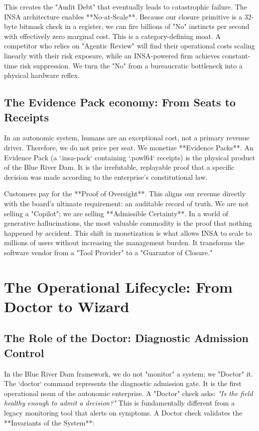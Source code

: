 \documentclass[12pt,a4paper,oneside]{book}
\begin{document}
This creates the "Audit Debt" that eventually leads to catastrophic failure. The INSA architecture enables **No-at-Scale**. Because our closure primitive is a 32-byte bitmask check in a register, we can fire billions of "No" instincts per second with effectively zero marginal cost. This is a category-defining moat. A competitor who relies on "Agentic Review" will find their operational costs scaling linearly with their risk exposure, while an INSA-powered firm achieves constant-time risk suppression. We turn the "No" from a bureaucratic bottleneck into a physical hardware reflex.

\section{The Evidence Pack economy: From Seats to Receipts}
In an autonomic system, humans are an exceptional cost, not a primary revenue driver. Therefore, we do not price per seat. We monetize **Evidence Packs**. An Evidence Pack (a `.insa-pack` containing `.powl64` receipts) is the physical product of the Blue River Dam. It is the irrefutable, replayable proof that a specific decision was made according to the enterprise's constitutional law. 

Customers pay for the **Proof of Oversight**. This aligns our revenue directly with the board's ultimate requirement: an auditable record of truth. We are not selling a "Copilot"; we are selling **Admissible Certainty**. In a world of generative hallucinations, the most valuable commodity is the proof that nothing happened by accident. This shift in monetization is what allows INSA to scale to millions of users without increasing the management burden. It transforms the software vendor from a "Tool Provider" to a "Guarantor of Closure."

\chapter{The Operational Lifecycle: From Doctor to Wizard}

\section{The Role of the Doctor: Diagnostic Admission Control}
In the Blue River Dam framework, we do not "monitor" a system; we "Doctor" it. The `doctor` command represents the diagnostic admission gate. It is the first operational noun of the autonomic enterprise. A "Doctor" check asks: \textit{"Is the field healthy enough to admit a decision?"} This is fundamentally different from a legacy monitoring tool that alerts on symptoms. A Doctor check validates the **Invariants of the System**:
\end{document}
